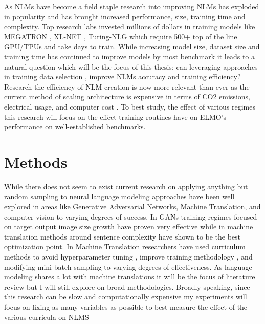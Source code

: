 \documentclass[11pt,a4paper]{article}
\begin{document}
As NLMs have become a field staple research into improving NLMs has exploded in popularity and has brought increased performance, size, training time and complexity. Top research labs invested millions of dollars in training models like MEGATRON \cite{Shoeybi2019MegatronLMTM}, XL-NET \cite{Yang2019XLNetGA}, Turing-NLG \cite{Rosset2020TNLG} which require 500+ top of the line GPU/TPUs and take days to train. While increasing model size, dataset size and training time has continued to improve models by most benchmark it leads to a natural question which will be the focus of this thesis: can leveraging approaches in training data selection \cite{Bengio2009CurriculumL} \cite{Karras2017ProgressiveGO} \cite{Tran2020SubsetSF} \cite{Chatterjee2017ProgressiveLF},  \cite{Settles2009ActiveLL}\cite{Berger1996AME} improve NLMs accuracy and training efficiency? Research the efficiency of NLM creation is now more relevant than ever as the current method of scaling architecture is expensive in terms of CO2 emissions, electrical usage, and computer cost  \cite{Strubell2019EnergyAP}. To best study, the effect of various regimes this research will focus on the effect training routines have on ELMO's performance on well-established benchmarks.
\section{Methods}
While there does not seem to exist current research on applying anything but random sampling to neural language modeling approaches have been well explored in areas like Generative Adversarial Networks, Machine Translation, and computer vision to varying degrees of success. In GANs training regimes focused on target output image size growth \cite{Karras2017ProgressiveGO} have proven very effective while in machine translation methods around sentence complexity have shown to be the best optimization point. In Machine Translation researchers have used curriculum methods to avoid hyperparameter tuning \cite{Kano2017StructuredBasedCL}, improve training methodology \cite{Guo2019FineTuningBC}, and modifying mini-batch sampling \cite{Kocmi2017CurriculumLA} to varying degrees of effectiveness. As language
modeling shares a lot with machine translations it will be the focus of literature review but I will still explore on broad methodologies.
Broadly speaking, since this research can be slow and computationally expensive my experiments will focus on fixing as many variables as possible to best measure the effect of the various curricula on NLMS
\end{document}
